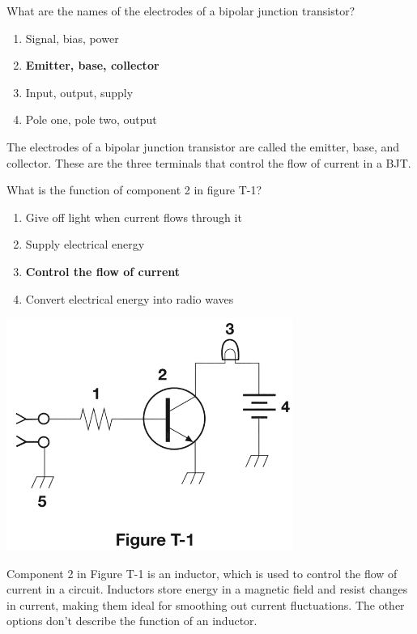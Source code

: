 \begin{tcolorbox}[colback=gray!10!white,colframe=black!75!black,title={T6B12}]
    What are the names of the electrodes of a bipolar junction transistor?
    \begin{enumerate}[label=\Alph*),noitemsep]
        \item Signal, bias, power
        \item \textbf{Emitter, base, collector}
        \item Input, output, supply
        \item Pole one, pole two, output
    \end{enumerate}
\end{tcolorbox}
The electrodes of a bipolar junction transistor are called the emitter, base, and collector. These are the three terminals that control the flow of current in a BJT.

\begin{tcolorbox}[
    colback=gray!10!white,
    colframe=black!75!black,
    title={T6D10},
    sidebyside,
    sidebyside align=top,
    lefthand width=0.45\textwidth
]
What is the function of component 2 in figure T-1?
\begin{enumerate}[label=\Alph*),noitemsep]
    \item Give off light when current flows through it
    \item Supply electrical energy
    \item \textbf{Control the flow of current}
    \item Convert electrical energy into radio waves
\end{enumerate}
\tcblower
\includegraphics[width=0.7\textwidth]{images/t1.png}
\end{tcolorbox}
Component 2 in Figure T-1 is an inductor, which is used to control the flow of current in a circuit. Inductors store energy in a magnetic field and resist changes in current, making them ideal for smoothing out current fluctuations. The other options don’t describe the function of an inductor.
